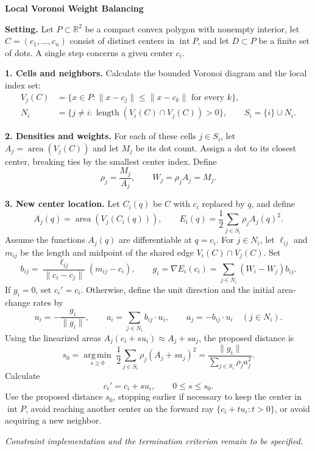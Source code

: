 \documentclass[11pt]{article}
\newcommand{\area}{\operatorname{area}}
\newcommand{\length}{\operatorname{length}}
\newcommand{\interior}{\operatorname{int}}
\begin{document}
\begin{center}
  {\Large\bfseries Local Voronoi Weight Balancing}
\end{center}
\vspace{-5pt}

\textbf{Setting.}
Let $P\subset\mathbb R^2$ be a compact convex polygon with nonempty
interior, let $C=(c_1,\ldots,c_n)$ consist of distinct centers in
$\interior P$, and let $D\subset P$ be a finite set of dots.
A single step concerns a given center $c_i$.

\medskip
\textbf{1. Cells and neighbors.}
Calculate the bounded Voronoi diagram and the local index set:
\begin{align*}
V_j(C)&=\{x\in P:\|x-c_j\|\leq\|x-c_k\|\text{ for every }k\},
\\
N_i&=\{j\ne i:\length(V_i(C)\cap V_j(C))>0\},
\qquad S_i=\{i\}\cup N_i.
\end{align*}

\textbf{2. Densities and weights.}
For each of these cells $j\in S_i$, let $A_j=\area(V_j(C))$ and let
$M_j$ be its dot count. Assign a dot to its closest center, breaking
ties by the smallest center index. Define
\[
\rho_j=\frac{M_j}{A_j},\qquad W_j=\rho_j A_j=M_j.
\]

\textbf{3. New center location.}
Let $C_i(q)$ be $C$ with $c_i$ replaced by $q$, and define
\[
A_j(q)=\area(V_j(C_i(q))),\qquad
E_i(q)=\frac12\sum_{j\in S_i}\rho_j A_j(q)^2.
\]
Assume the functions $A_j(q)$ are differentiable at $q=c_i$.
For $j\in N_i$, let $\ell_{ij}$ and $m_{ij}$ be the length and
midpoint of the shared edge $V_i(C)\cap V_j(C)$. Set
\[
b_{ij}=\frac{\ell_{ij}}{\|c_i-c_j\|}(m_{ij}-c_i),\qquad
g_i=\nabla E_i(c_i)=\sum_{j\in N_i}(W_i-W_j)b_{ij}.
\]
If $g_i=0$, set $c_i'=c_i$. Otherwise, define the unit direction
and the initial area-change rates by
\[
u_i=-\frac{g_i}{\|g_i\|},\qquad
a_i=\sum_{j\in N_i}b_{ij}\cdot u_i,\qquad
a_j=-b_{ij}\cdot u_i\quad(j\in N_i).
\]
Using the linearized areas $A_j(c_i+s u_i)\approx A_j+s a_j$,
the proposed distance is
\[
\boxed{\displaystyle
s_0=\underset{s\geq0}{\operatorname{arg\,min}}\;
\frac12\sum_{j\in S_i}\rho_j(A_j+s a_j)^2
=\frac{\|g_i\|}{\displaystyle\sum_{j\in S_i}\rho_j a_j^2}.}
\]
Calculate
\[
\boxed{c_i'=c_i+s u_i,\qquad 0\leq s\leq s_0.}
\]
Use the proposed distance $s_0$, stopping earlier if necessary to
keep the center in $\interior P$, avoid reaching another center on
the forward ray $\{c_i+t u_i:t>0\}$, or avoid acquiring a new neighbor.

\medskip
\textit{Constraint implementation and the termination criterion remain to be specified.}
\end{document}
